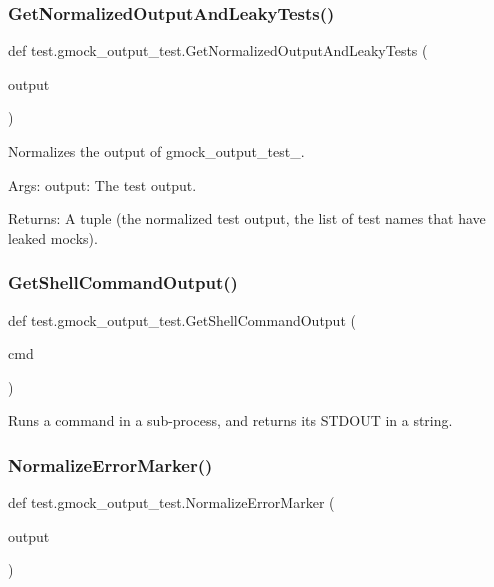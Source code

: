 \subsubsection{\texorpdfstring{GetNormalizedOutputAndLeakyTests()}{GetNormalizedOutputAndLeakyTests()}}
{\footnotesize\ttfamily def test.\+gmock\+\_\+output\+\_\+test.\+Get\+Normalized\+Output\+And\+Leaky\+Tests (\begin{DoxyParamCaption}\item[{}]{output }\end{DoxyParamCaption})}

\begin{DoxyVerb}Normalizes the output of gmock_output_test_.

Args:
  output: The test output.

Returns:
  A tuple (the normalized test output, the list of test names that have
  leaked mocks).
\end{DoxyVerb}
 \mbox{\label{namespacetest_1_1gmock__output__test_ae7647061e8725a9c7222603df3ef1add}} 
\subsubsection{\texorpdfstring{GetShellCommandOutput()}{GetShellCommandOutput()}}
{\footnotesize\ttfamily def test.\+gmock\+\_\+output\+\_\+test.\+Get\+Shell\+Command\+Output (\begin{DoxyParamCaption}\item[{}]{cmd }\end{DoxyParamCaption})}

\begin{DoxyVerb}Runs a command in a sub-process, and returns its STDOUT in a string.\end{DoxyVerb}
 \mbox{\label{namespacetest_1_1gmock__output__test_a878e940ca427748eb153497e91f31793}} 
\subsubsection{\texorpdfstring{NormalizeErrorMarker()}{NormalizeErrorMarker()}}
{\footnotesize\ttfamily def test.\+gmock\+\_\+output\+\_\+test.\+Normalize\+Error\+Marker (\begin{DoxyParamCaption}\item[{}]{output }\end{DoxyParamCaption})}

